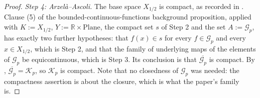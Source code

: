 \begin{proof}
\medskip\noindent\emph{Step 4: Arzel\`a--Ascoli.}
The base space $X_{1/2}$ is compact, as recorded in .  Clause (5) of the
bounded-continuous-functions background proposition, applied with $K:=X_{1/2}$,
$Y:=\mathbb{R}\times\mathrm{Plane}$, the compact set $s$ of Step 2 and the set
$A:=\mathcal{G}_p$, has exactly two further hypotheses: that $f(x)\in s$ for every
$f\in\mathcal{G}_p$ and every $x\in X_{1/2}$, which is Step 2, and that the family of underlying
maps of the elements of $\mathcal{G}_p$ be equicontinuous, which is Step 3.  Its conclusion is
that $\overline{\mathcal{G}_p}$ is compact.  By ,
$\overline{\mathcal{G}_p}=\mathcal{K}_p$, so $\mathcal{K}_p$ is compact.  Note that no
closedness of $\mathcal{G}_p$ was needed: the compactness assertion is about the closure, which
is what the paper's family is.
\end{proof}
